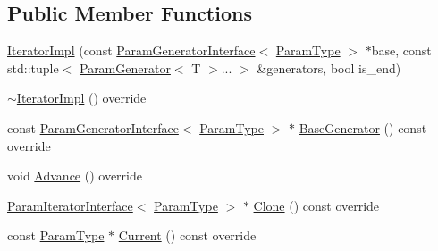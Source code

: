 \subsection*{Public Member Functions}
\begin{DoxyCompactItemize}
\item 
\mbox{\hyperlink{classtesting_1_1internal_1_1_cartesian_product_generator_1_1_iterator_impl_3_01_index_sequence_3_01_i_8_8_8_01_4_01_4_a3c28d20b4527f146a97c5490326f869f}{Iterator\+Impl}} (const \mbox{\hyperlink{classtesting_1_1internal_1_1_param_generator_interface}{Param\+Generator\+Interface}}$<$ \mbox{\hyperlink{classtesting_1_1internal_1_1_cartesian_product_generator_af27131157a9347f0c82420ca081ee7dd}{Param\+Type}} $>$ $\ast$base, const std\+::tuple$<$ \mbox{\hyperlink{classtesting_1_1internal_1_1_param_generator}{Param\+Generator}}$<$ T $>$... $>$ \&generators, bool is\+\_\+end)
\item 
\mbox{\hyperlink{classtesting_1_1internal_1_1_cartesian_product_generator_1_1_iterator_impl_3_01_index_sequence_3_01_i_8_8_8_01_4_01_4_adf6a47392283d7e236b604f487cf8cfc}{$\sim$\+Iterator\+Impl}} () override
\item 
const \mbox{\hyperlink{classtesting_1_1internal_1_1_param_generator_interface}{Param\+Generator\+Interface}}$<$ \mbox{\hyperlink{classtesting_1_1internal_1_1_cartesian_product_generator_af27131157a9347f0c82420ca081ee7dd}{Param\+Type}} $>$ $\ast$ \mbox{\hyperlink{classtesting_1_1internal_1_1_cartesian_product_generator_1_1_iterator_impl_3_01_index_sequence_3_01_i_8_8_8_01_4_01_4_a8fa3ea322a1348fc8065481aba76e860}{Base\+Generator}} () const override
\item 
void \mbox{\hyperlink{classtesting_1_1internal_1_1_cartesian_product_generator_1_1_iterator_impl_3_01_index_sequence_3_01_i_8_8_8_01_4_01_4_a167e8b38118c8635d5849daf924a517b}{Advance}} () override
\item 
\mbox{\hyperlink{classtesting_1_1internal_1_1_param_iterator_interface}{Param\+Iterator\+Interface}}$<$ \mbox{\hyperlink{classtesting_1_1internal_1_1_cartesian_product_generator_af27131157a9347f0c82420ca081ee7dd}{Param\+Type}} $>$ $\ast$ \mbox{\hyperlink{classtesting_1_1internal_1_1_cartesian_product_generator_1_1_iterator_impl_3_01_index_sequence_3_01_i_8_8_8_01_4_01_4_a0b434e09b32dfd6b444085cf95dc22ab}{Clone}} () const override
\item 
const \mbox{\hyperlink{classtesting_1_1internal_1_1_cartesian_product_generator_af27131157a9347f0c82420ca081ee7dd}{Param\+Type}} $\ast$ \mbox{\hyperlink{classtesting_1_1internal_1_1_cartesian_product_generator_1_1_iterator_impl_3_01_index_sequence_3_01_i_8_8_8_01_4_01_4_ab7052f320ab8ff3113a3e744a1bff07e}{Current}} () const override

\end{DoxyCompactItemize}
